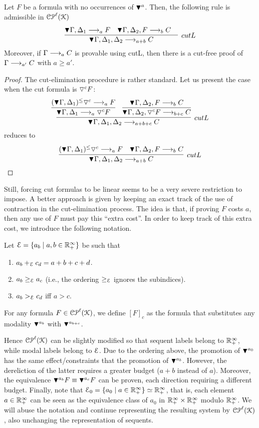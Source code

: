 \begin{theorem}
Let $F$ be a formula with no occurrences of 
$\blacktriangledown^{a}$. Then, the following rule is admissible in $\mathcal{CP}^\ell(\mathcal{K})$
\[
\infer[cutL]{\pnbang{}\Gamma,\Delta_1,\Delta_2 \lraS{a + b} C}{
 \deduce{\pnbang{}\Gamma,\Delta_1 \lraS{a}F}{}&
 \deduce{\pnbang{}\Gamma,\Delta_2, F \lraS{b}C}{}&
}
\]
Moreover, if $\Gamma \longrightarrow_{a} C$ is provable using cutL, then there is a cut-free proof of 
$\Gamma \longrightarrow_{a'}C$ with $a \geq a'$.
\end{theorem}
\begin{proof}
The cut-elimination procedure is rather standard. Let us present the case when the cut formula is $\triangledown^{c}F$: 
\[
\infer[cutL]{\pnbang{}\Gamma,\Delta_1,\Delta_2\lraS{a+b+c} C}{
 \infer{\pnbang{}\Gamma,\Delta_1 \lraS{a} \vnbang{c}F}{(\pnbang{}\Gamma,\Delta_1)^\leqvn{c} \lraS{a} F}
 &
 \infer{\pnbang{}\Gamma,\Delta_2, \vnbang{c}F \lraS{b+c} C}{\pnbang{}\Gamma,\Delta_2, F \lraS{b} C}
}
\]
reduces to
\[
\infer[cutL]{\pnbang{}\Gamma,\Delta_1, \Delta_2\lraS{a+b} C}{
 \deduce{(\pnbang{}\Gamma,\Delta_1)^\leqvn{c}  \lraS{a} F}{}
 &
 \deduce{\pnbang{}\Gamma,\Delta_2, F \lraS{b} C}{}
}
\]
\end{proof}
Still, forcing cut formulas to be linear seems to be a very severe restriction
to impose. A better approach is given by keeping an exact track of the use of contraction in the cut-elimination process.  
The idea is that, if proving $F$ costs $a$, then any use of $F$  
must pay this ``extra cost''. In order to keep track of this extra cost, we introduce the following notation.

\begin{definition}
Let $\mathcal{E}=\{a_b\mid a,b\in \mathbb{R}_+^\infty\}$ be such that 
\begin{enumerate}
\item $a_b+_{\mathcal{E}} c_d=a+b+c+d$.
\item $a_b \geq_{\mathcal{E}} a_c$ (i.e., the ordering $\geq_{\mathcal{E}}$ ignores the subindices).
\item $a_b >_{\mathcal{E}} c_d$ iff $a>c$.
\end{enumerate}
For any formula $F\in\mathcal{CP}^\ell(\mathcal{K})$, we define $[F]_c$ as the formula that substitutes any 
modality $\blacktriangledown^{a_b}{}$ with $\blacktriangledown^{a_{b+c}}$.
\end{definition}
Hence $\mathcal{CP}^\ell(\mathcal{K})$ can be slightly modified so that sequent labels belong to  $\mathbb{R}_+^\infty$, while modal labels belong to $\mathcal{E}$. Due to the ordering above, the promotion of $\blacktriangledown^{a_0}$ 
has the same effect/constraints that the promotion of $\blacktriangledown^{a_b}$. However, the dereliction of the latter requires a greater budget ($a+b$ instead of $a$). Moreover, the equivalence $\blacktriangledown^{a_b}F \equiv \blacktriangledown^{a_c}F$ can be proven, each direction requiring a different budget.
Finally, note that $\mathcal{E}_0=\{a_0\mid a\in \mathbb{R}_+^\infty\}\simeq \mathbb{R}_+^\infty$, that is, each element $a\in\mathbb{R}_+^\infty$ can be seen as the equivalence class of $a_0$ in $\mathbb{R}_+^\infty\times \mathbb{R}_+^\infty$ modulo $\mathbb{R}_+^\infty$.
We will abuse the notation and continue representing the resulting system by $\mathcal{CP}^\ell(\mathcal{K})$, also unchanging the representation of sequents. 


